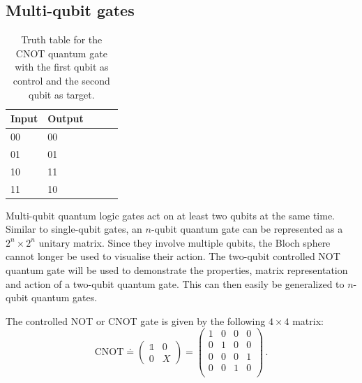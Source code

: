 \subsection{Multi-qubit gates}
\label{subsubsec:multiqubitgates}
\begin{table}[H]
\begin{center}
\begin{tabular}{l|lccc}\hline
Input & Output \\ \hline
00 & 00 \\
01 & 01 \\
10 & 11 \\
11 & 10 \\ \hline
\end{tabular}
\end{center}
\caption{Truth table for the CNOT quantum gate with the first qubit as control and the second qubit as target.}\vspace{1ex}
\label{tab:cnottruthtable}
\end{table}
Multi-qubit quantum logic gates act on at least two qubits at the same time. Similar to single-qubit gates, an $n$-qubit quantum gate can be represented as a $2^n\times2^n$ unitary matrix. Since they involve multiple qubits, the Bloch sphere cannot longer be used to visualise their action. The two-qubit controlled NOT quantum gate will be used to demonstrate the properties, matrix representation and action of a two-qubit quantum gate. This can then easily be generalized to $n$-qubit quantum gates.

The controlled NOT or CNOT gate is given by the following $4\times4$ matrix:
\begin{equation}
\mathrm{CNOT} \doteq \begin{pmatrix}
 \mathbb{1} & 0 \\ 
 0 & X
 \end{pmatrix} = \begin{pmatrix}
 1 & 0 & 0 & 0 \\ 
 0 & 1 & 0 & 0 \\
 0 & 0 & 0 & 1 \\
 0 & 0 & 1 & 0 \\
 \end{pmatrix}\, .
\end{equation}

